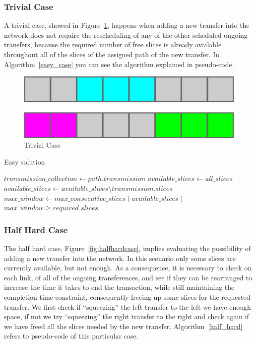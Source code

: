 \documentclass[11pt,a4paper]{article}
\begin{document}
\subsubsection{Trivial Case}

A trivial case, showed in Figure~\ref{fig:trivial}, happens when adding a new transfer into the network does not require the rescheduling of any of the other scheduled ongoing transfers, because the required number of free slices is already available throughout all of the slices of the assigned path of the new transfer. In Algorithm~\ref{easy_case} you can see the algorithm explained in pseudo-code.\\

\begin{figure}[H]
  \centering
    \includegraphics[scale=1]{trivialcase.jpg}
  \caption{Trivial Case}
  \label{fig:trivial}
\end{figure}

\begin{algorithm}[H]
\caption{Easy solution}\label{easy_case}
\begin{algorithmic}[1]
	\State $transmission\_collection\gets path.transmission$
	\State $available\_slices\gets all\_slices$
      \State $available\_slices \gets available\_slices\setminus transmission.slices$
	\EndFor
	\State $max\_window \gets max\_consecutive\_slices(available\_slices)$
	\State \Return $max\_window \geq required\_slices$
\EndProcedure
\end{algorithmic}
\end{algorithm}

\subsubsection{Half Hard Case}

The half hard case, Figure~\ref{fig:halfhardcase}, implies evaluating the possibility of adding a new transfer into the network. In this scenario only some slices are currently available, but not enough. As a consequence, it is necessary to check on each link, of all of the ongoing transferences, and see if they can be rearranged to increase the time it takes to end the transaction, while still maintaining the completion time constraint, consequently freeing up some slices for the requested transfer. We first check if ``squeezing'' the left transfer to the left we have enough space, if not we try ``squeezing'' the right transfer to the right and check again if we have freed all the slices needed by the new transfer. Algorithm~\ref{half_hard} refers to pseudo-code of this particular case.\\
\end{document}
